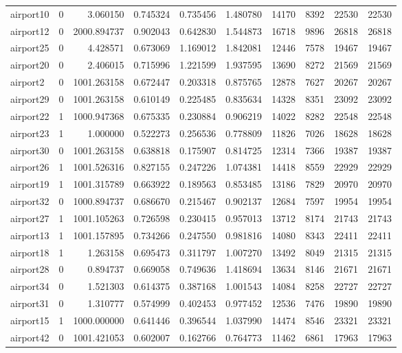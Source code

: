 \begin{longtable}{|l|r|r|r|r|r|r|r|r|r|}
airport10 & 0 & 3.060150 & 0.745324 & 0.735456 & 1.480780 & 14170 & 8392 & 22530 & 22530 \\
airport12 & 0 & 2000.894737 & 0.902043 & 0.642830 & 1.544873 & 16718 & 9896 & 26818 & 26818 \\
airport25 & 0 & 4.428571 & 0.673069 & 1.169012 & 1.842081 & 12446 & 7578 & 19467 & 19467 \\
airport20 & 0 & 2.406015 & 0.715996 & 1.221599 & 1.937595 & 13690 & 8272 & 21569 & 21569 \\
airport2 & 0 & 1001.263158 & 0.672447 & 0.203318 & 0.875765 & 12878 & 7627 & 20267 & 20267 \\
airport29 & 0 & 1001.263158 & 0.610149 & 0.225485 & 0.835634 & 14328 & 8351 & 23092 & 23092 \\
airport22 & 1 & 1000.947368 & 0.675335 & 0.230884 & 0.906219 & 14022 & 8282 & 22548 & 22548 \\
airport23 & 1 & 1.000000 & 0.522273 & 0.256536 & 0.778809 & 11826 & 7026 & 18628 & 18628 \\
airport30 & 0 & 1001.263158 & 0.638818 & 0.175907 & 0.814725 & 12314 & 7366 & 19387 & 19387 \\
airport26 & 1 & 1001.526316 & 0.827155 & 0.247226 & 1.074381 & 14418 & 8559 & 22929 & 22929 \\
airport19 & 1 & 1001.315789 & 0.663922 & 0.189563 & 0.853485 & 13186 & 7829 & 20970 & 20970 \\
airport32 & 0 & 1000.894737 & 0.686670 & 0.215467 & 0.902137 & 12684 & 7597 & 19954 & 19954 \\
airport27 & 1 & 1001.105263 & 0.726598 & 0.230415 & 0.957013 & 13712 & 8174 & 21743 & 21743 \\
airport13 & 1 & 1001.157895 & 0.734266 & 0.247550 & 0.981816 & 14080 & 8343 & 22411 & 22411 \\
airport18 & 1 & 1.263158 & 0.695473 & 0.311797 & 1.007270 & 13492 & 8049 & 21315 & 21315 \\
airport28 & 0 & 0.894737 & 0.669058 & 0.749636 & 1.418694 & 13634 & 8146 & 21671 & 21671 \\
airport34 & 0 & 1.521303 & 0.614375 & 0.387168 & 1.001543 & 14084 & 8258 & 22727 & 22727 \\
airport31 & 0 & 1.310777 & 0.574999 & 0.402453 & 0.977452 & 12536 & 7476 & 19890 & 19890 \\
airport15 & 1 & 1000.000000 & 0.641446 & 0.396544 & 1.037990 & 14474 & 8546 & 23321 & 23321 \\
airport42 & 0 & 1001.421053 & 0.602007 & 0.162766 & 0.764773 & 11462 & 6861 & 17963 & 17963 \\

\end{longtable}
